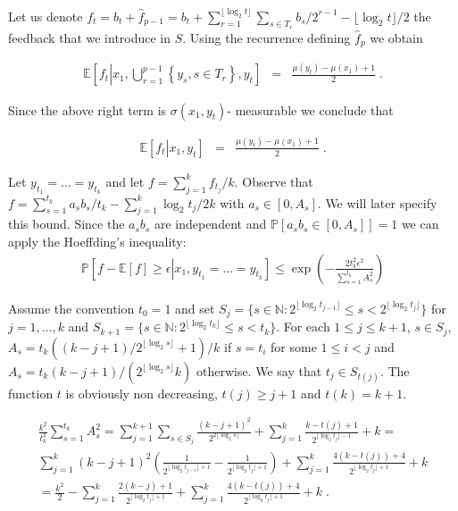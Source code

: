 \documentclass{article}
\numberwithin{equation}{section}
\theoremstyle{plain}
\theoremstyle{plain}
\theoremstyle{plain}
\theoremstyle{remark}
\theoremstyle{remark}
\newcommand{\1}{\ensuremath{\mathbbm{1}}}
\newcommand{\N}{\mathbb{N}}
\newcommand{\E}{\mathbb{E}}
\newcommand{\PP}{\mathbb{P}}
\newcommand{\Dfrac}[2]{{\displaystyle \frac{#1}{#2}}}
\begin{document}
Let us denote $f_{t}=b_{t}+\hat{f}_{p-1}=b_{t}+\sum_{r=1}^{\lfloor\log_{2}t\rfloor}\sum_{s\in T_{r}}b_{s}/2^{r-1}-\lfloor\log_{2}t\rfloor/2$ the feedback that we introduce in $S$. Using the recurrence defining $\hat{f}_{p}$ we obtain

\begin{eqnarray*}
\E\left[f_{t}\left|x_{1},\bigcup_{r=1}^{p-1}\left\{y_{s},s\in T_{r}\right\}, y_{t}\right.\right] &=& \Dfrac{\mu\left(y_{t}\right)-\mu\left(x_{1}\right)+1}{2}\;.
\end{eqnarray*}

Since the above right term is $\sigma(x_{1},y_{t})$- measurable we conclude that

\begin{eqnarray*}
\E\left[f_{t}\left|x_{1},y_{t}\right.\right] &=& \Dfrac{\mu\left(y_{t}\right)-\mu\left(x_{1}\right)+1}{2}\;.
\end{eqnarray*}

Let $y_{t_{1}}=\ldots=y_{t_{k}}$ and let $f=\sum_{j=1}^{k}f_{t_{j}}/k$. Observe that $f=\sum_{s=1}^{t_{k}}a_{s}b_{s}/t_{k}-\sum_{j=1}^{k}\log_{2}t_{j}/2k$ with $a_{s}\in[0,A_{s}]$. We will later specify this bound. Since the $a_{s}b_{s}$ are independent and $\PP[a_{s}b_{s}\in[0,A_{s}]]=1$ we can apply the Hoeffding's inequality:
\begin{eqnarray*}
\PP\left[f-\E\left[f\right]\geq\epsilon\left|x_{1},y_{t_{1}}=\ldots=y_{t_{k}}\right.\right]\leq \exp\left(-\frac{2t_{k}^{2}\epsilon^{2}}{\sum_{s=1}^{t_{k}}A_{s}^{2}}\right)
\end{eqnarray*}

Assume the convention $t_{0}=1$ and set $S_{j}=\{s\in\N:2^{\lfloor\log_{2} t_{j-1}\rfloor}\leq s<2^{\lfloor\log_{2} t_{j}\rfloor}\}$ for $j=1,\ldots,k$ and $S_{k+1}=\{s\in\N:2^{\lfloor\log_{2} t_{k}\rfloor}\leq s<t_{k}\}$. For each $1\leq j\leq k+1$, $s\in S_{j}$, $A_{s}=t_{k}((k-j+1)/2^{\lfloor\log_{2} s\rfloor}+1)/k$ if $s=t_{i}$ for some $1\leq i<j$ and $A_{s}=t_{k}(k-j+1)/(2^{\lfloor\log_{2} s\rfloor}k)$ otherwise. We say that $t_{j}\in S_{t(j)}$. The function $t$ is obviously non decreasing, $t(j)\geq j+1$ and $t(k)=k+1$.

\begin{multline*}
\frac{k^{2}}{t_{k}^{2}}\sum\limits_{s=1}^{t_{k}}A_{s}^{2} = \sum\limits_{j=1}^{k+1}\sum\limits_{s\in S_{j}}\frac{(k-j+1)^{2}}{2^{2\lfloor\log_{2} s\rfloor}}+\sum\limits_{j=1}^{k}\frac{k-t(j)+1}{2^{\lfloor\log_{2} t_{j}\rfloor-1}}+k = \\ \sum\limits_{j=1}^{k}(k-j+1)^{2}\left(\frac{1}{2^{\lfloor\log_{2} t_{j-1}\rfloor+1}}-\frac{1}{2^{\lfloor\log_{2} t_{j}\rfloor+1}}\right)+\sum\limits_{j=1}^{k}\frac{4(k-t(j))+4}{2^{\lfloor\log_{2} t_{j}\rfloor+1}}+k \\
= \frac{k^{2}}{2}-\sum\limits_{j=1}^{k}\frac{2(k-j)+1}{2^{\lfloor\log_{2} t_{j}\rfloor+1}} +\sum\limits_{j=1}^{k}\frac{4(k-t(j))+4}{2^{\lfloor\log_{2} t_{j}\rfloor+1}}+k \;.
\end{multline*}
\end{document}
